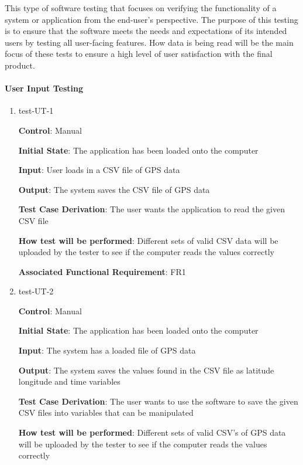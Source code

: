 \documentclass[12pt, titlepage]{article}
\begin{document}
This type of software testing that focuses on verifying the functionality of a system or application from the end-user's perspective. The purpose of this testing is to ensure that the software meets the needs and expectations of its intended users by testing all user-facing features. How data is being read will be the main focus of these tests to ensure a high level of user satisfaction with the final product.



		
\paragraph{User Input Testing}

\begin{enumerate}

\item{test-UT-1\\}

\textbf{Control}: Manual 
					
\textbf{Initial State}: The application has been loaded onto the computer
					
\textbf{Input}: User loads in a CSV file of GPS data
				
\textbf{Output}: The system saves the CSV file of GPS data

\textbf{Test Case Derivation}: The user wants the application to read the given CSV file 
					
\textbf{How test will be performed}: Different sets of valid CSV data will be uploaded by the tester to see if the computer reads the values correctly

\textbf{Associated Functional Requirement}: FR1 

\item{test-UT-2\\}

\textbf{Control}: Manual 
					
\textbf{Initial State}: The application has been loaded onto the computer
					
\textbf{Input}: The system has a loaded file of GPS data 
					
\textbf{Output}: The system saves the values found in the CSV file as latitude longitude and time variables

\textbf{Test Case Derivation}: The user wants to use the software to save the given CSV files into variables that can be manipulated
					
\textbf{How test will be performed}: Different sets of valid CSV's of GPS data will be uploaded by the tester to see if the computer reads the values correctly


\end{enumerate}
\end{document}

